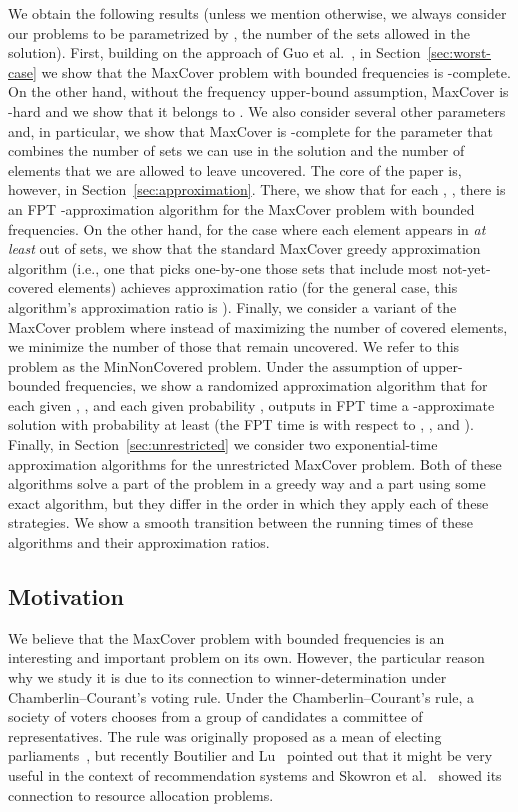 \documentclass[11pt]{article}
\begin{document}
We obtain the following results (unless we mention otherwise, we
always consider our problems to be parametrized by , the number of
the sets allowed in the solution).  First, building on the approach of
Guo et al.~\cite{guo-nie-wer:j:vertex-cover-variants}, in
Section~\ref{sec:worst-case} we show that the MaxCover problem with
bounded frequencies is -complete.
On the other hand, without the frequency upper-bound assumption,
MaxCover is -hard and we show that it belongs to . We
also consider several other parameters and, in particular, we show
that MaxCover is -complete for the parameter that combines the
number of sets we can use in the solution and the number of elements
that we are allowed to leave uncovered.  The core of the paper is,
however, in Section~\ref{sec:approximation}.  There, we show that for
each , , there is an FPT -approximation
algorithm for the MaxCover problem with bounded frequencies.  On the
other hand, for the case where each element appears in \emph{at least}
 out of  sets, we show that the standard MaxCover greedy
approximation algorithm (i.e., one that picks one-by-one those sets
that include most not-yet-covered elements) achieves approximation
ratio  (for the general case, this algorithm's
approximation ratio is ). Finally, we consider a
variant of the MaxCover problem where instead of maximizing the number
of covered elements, we minimize the number of those that remain
uncovered. We refer to this problem as the MinNonCovered problem.
Under the assumption of upper-bounded frequencies, we show a
randomized approximation algorithm that for each given , , and each given probability , outputs in FPT time a
-approximate solution with probability at least 
(the FPT time is with respect to , , and ).
Finally, in Section~\ref{sec:unrestricted} we consider two
exponential-time approximation algorithms for the unrestricted
MaxCover problem. Both of these algorithms solve a part of the problem
in a greedy way and a part using some exact algorithm, but they differ
in the order in which they apply each of these strategies. We show a
smooth transition between the running times of these algorithms and their
approximation ratios.



\subsection{Motivation}

We believe that the MaxCover problem with bounded frequencies is
an interesting and important problem on its own. However, the
particular reason why we study it is due to its connection to
winner-determination under Chamberlin--Courant's voting rule. Under
the Chamberlin--Courant's rule, a society of  voters chooses from a
group of  candidates a committee of  representatives. The rule
was originally proposed as a mean of electing
parliaments~\cite{ccElection}, but recently Boutilier and
Lu~\cite{budgetSocialChoice} pointed out that it might be very useful
in the context of recommendation systems and Skowron et
al.~\cite{sko-fal-sli:c:multiwinner} showed its connection to 
resource allocation problems.
\end{document}
